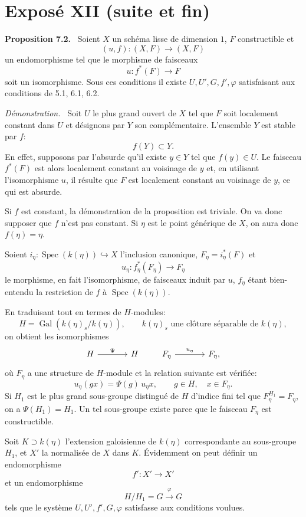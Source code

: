 \documentclass[11pt]{article}
\newenvironment{statement}[1]{\par\medskip\noindent\textbf{#1.}\ }{\par\medskip}
\newenvironment{prooftext}[1][Proof]{\par\noindent\emph{#1.}\ }{\par\medskip}
\DeclareMathOperator{\Spec}{Spec}
\providecommand{\Gal}{\operatorname{Gal}}
\providecommand{\Spec}{\operatorname{Spec}}
\providecommand{\Spec}{\operatorname{Spec}}
\providecommand{\Spec}{\operatorname{Spec}}
\begin{document}
\section*{Exposé XII (suite et fin)}

\begin{statement}{Proposition 7.2}
Soient $X$ un schéma lisse de dimension $1$, $F$ constructible et
\[
(u,f):(X,F)\longrightarrow (X,F)
\]
un endomorphisme tel que le morphisme de faisceaux
\[
u:f^*(F)\longrightarrow F
\]
soit un isomorphisme. Sous ces conditions il existe $U,U',G,f',\varphi$ satisfaisant aux conditions de 5.1, 6.1, 6.2.
\end{statement}

\begin{prooftext}[Démonstration]
Soit $U$ le plus grand ouvert de $X$ tel que $F$ soit localement constant dans $U$ et désignons par $Y$ son complémentaire. L'ensemble $Y$ est stable par $f$:
\[
f(Y)\subset Y.
\]
En effet, supposons par l'absurde qu'il existe $y\in Y$ tel que $f(y)\in U$. Le faisceau $f^*(F)$ est alors localement constant au voisinage de $y$ et, en utilisant l'isomorphisme $u$, il résulte que $F$ est localement constant au voisinage de $y$, ce qui est absurde.

Si $f$ est constant, la démonstration de la proposition est triviale. On va donc supposer que $f$ n'est pas constant. Si $\eta$ est le point générique de $X$, on aura donc $f(\eta)=\eta$.

Soient $i_\eta:\Spec(k(\eta))\hookrightarrow X$ l'inclusion canonique, $F_\eta=i_\eta^*(F)$ et
\[
u_\eta:f_\eta^*(F_\eta)\longrightarrow F_\eta
\]
le morphisme, en fait l'isomorphisme, de faisceaux induit par $u$, $f_\eta$ étant bien-entendu la restriction de $f$ à $\Spec(k(\eta))$.

En traduisant tout en termes de $H$-modules:
\[
H=\Gal(k(\eta)_s/k(\eta)),\qquad k(\eta)_s\text{ une clôture séparable de }k(\eta),
\]
on obtient les isomorphismes
\[
\begin{tikzcd}[column sep=large]
H \arrow[r,"\Psi"] & H
\end{tikzcd}
\qquad
\begin{tikzcd}[column sep=large]
F_\eta \arrow[r,"u_\eta"] & F_\eta,
\end{tikzcd}
\]
où $F_\eta$ a une structure de $H$-module et la relation suivante est vérifiée:
\[
u_\eta(gx)=\Psi(g)\,u_\eta x,
\qquad g\in H,
\quad x\in F_\eta.
\]
Si $H_1$ est le plus grand sous-groupe distingué de $H$ d'indice fini tel que $F_\eta^{H_1}=F_\eta$, on a $\Psi(H_1)=H_1$. Un tel sous-groupe existe parce que le faisceau $F_\eta$ est constructible.

Soit $K\supset k(\eta)$ l'extension galoisienne de $k(\eta)$ correspondante au sous-groupe $H_1$, et $X'$ la normalisée de $X$ dans $K$. Évidemment on peut définir un endomorphisme
\[
f':X'\longrightarrow X'
\]
et un endomorphisme
\[
H/H_1=G\xrightarrow{\varphi}G
\]
tels que le système $U,U',f',G,\varphi$ satisfasse aux conditions voulues.
\end{prooftext}
\end{document}
